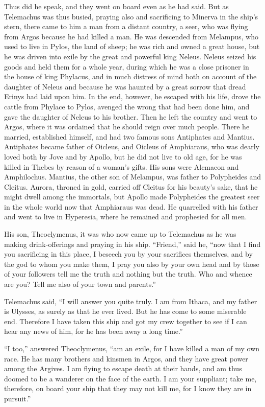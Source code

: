 Thus did he speak, and they went on board even as he had said. But as
Telemachus was thus busied, praying also and sacrificing to Minerva in the
ship’s stern, there came to him a man from a distant country, a seer, who was
flying from Argos because he had killed a man. He was descended from Melampus,
who used to live in Pylos, the land of sheep; he was rich and owned a great
house, but he was driven into exile by the great and powerful king Neleus.
Neleus seized his goods and held them for a whole year, during which he was a
close prisoner in the house of king Phylacus, and in much distress of mind both
on account of the daughter of Neleus and because he was haunted by a great
sorrow that dread Erinys had laid upon him. In the end, however, he escaped
with his life, drove the cattle from Phylace to Pylos, avenged the wrong that
had been done him, and gave the daughter of Neleus to his brother. Then he left
the country and went to Argos, where it was ordained that he should reign over
much people. There he married, established himself, and had two famous sons
Antiphates and Mantius. Antiphates became father of Oicleus, and Oicleus of
Amphiaraus, who was dearly loved both by Jove and by Apollo, but he did not
live to old age, for he was killed in Thebes by reason of a woman’s gifts. His
sons were Alcmaeon and Amphilochus. Mantius, the other son of Melampus, was
father to Polypheides and Cleitus. Aurora, throned in gold, carried off Cleitus
for his beauty’s sake, that he might dwell among the immortals, but Apollo made
Polypheides the greatest seer in the whole world now that Amphiaraus was dead.
He quarrelled with his father and went to live in Hyperesia, where he remained
and prophesied for all men.

His son, Theoclymenus, it was who now came up to Telemachus as he was making
drink-offerings and praying in his ship. “Friend,” said he, “now that I find
you sacrificing in this place, I beseech you by your sacrifices themselves, and
by the god to whom you make them, I pray you also by your own head and by those
of your followers tell me the truth and nothing but the truth. Who and whence
are you? Tell me also of your town and parents.”

Telemachus said, “I will answer you quite truly. I am from Ithaca, and my
father is Ulysses, as surely as that he ever lived. But he has come to some
miserable end. Therefore I have taken this ship and got my crew together to see
if I can hear any news of him, for he has been away a long time.”

“I too,” answered Theoclymenus, “am an exile, for I have killed a man of my own
race. He has many brothers and kinsmen in Argos, and they have great power
among the Argives. I am flying to escape death at their hands, and am thus
doomed to be a wanderer on the face of the earth. I am your suppliant; take me,
therefore, on board your ship that they may not kill me, for I know they are in
pursuit.”

